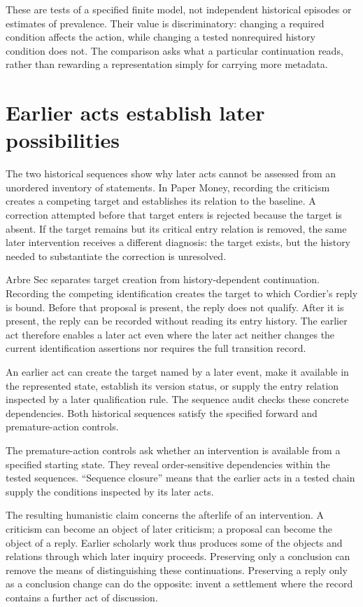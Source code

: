 \documentclass[11pt,a4paper]{article}
\begin{document}
These are tests of a specified finite model, not independent historical episodes or estimates of prevalence. Their value is discriminatory: changing a required condition affects the action, while changing a tested nonrequired history condition does not. The comparison asks what a particular continuation reads, rather than rewarding a representation simply for carrying more metadata.


\section{Earlier acts establish later possibilities}

The two historical sequences show why later acts cannot be assessed from an unordered inventory of statements. In Paper Money, recording the criticism creates a competing target and establishes its relation to the baseline. A correction attempted before that target enters is rejected because the target is absent. If the target remains but its critical entry relation is removed, the same later intervention receives a different diagnosis: the target exists, but the history needed to substantiate the correction is unresolved.


Arbre Sec separates target creation from history-dependent continuation. Recording the competing identification creates the target to which Cordier's reply is bound. Before that proposal is present, the reply does not qualify. After it is present, the reply can be recorded without reading its entry history. The earlier act therefore enables a later act even where the later act neither changes the current identification assertions nor requires the full transition record.


An earlier act can create the target named by a later event, make it available in the represented state, establish its version status, or supply the entry relation inspected by a later qualification rule. The sequence audit checks these concrete dependencies. Both historical sequences satisfy the specified forward and premature-action controls.


The premature-action controls ask whether an intervention is available from a specified starting state. They reveal order-sensitive dependencies within the tested sequences. “Sequence closure” means that the earlier acts in a tested chain supply the conditions inspected by its later acts.


The resulting humanistic claim concerns the afterlife of an intervention. A criticism can become an object of later criticism; a proposal can become the object of a reply. Earlier scholarly work thus produces some of the objects and relations through which later inquiry proceeds. Preserving only a conclusion can remove the means of distinguishing these continuations. Preserving a reply only as a conclusion change can do the opposite: invent a settlement where the record contains a further act of discussion.
\end{document}

